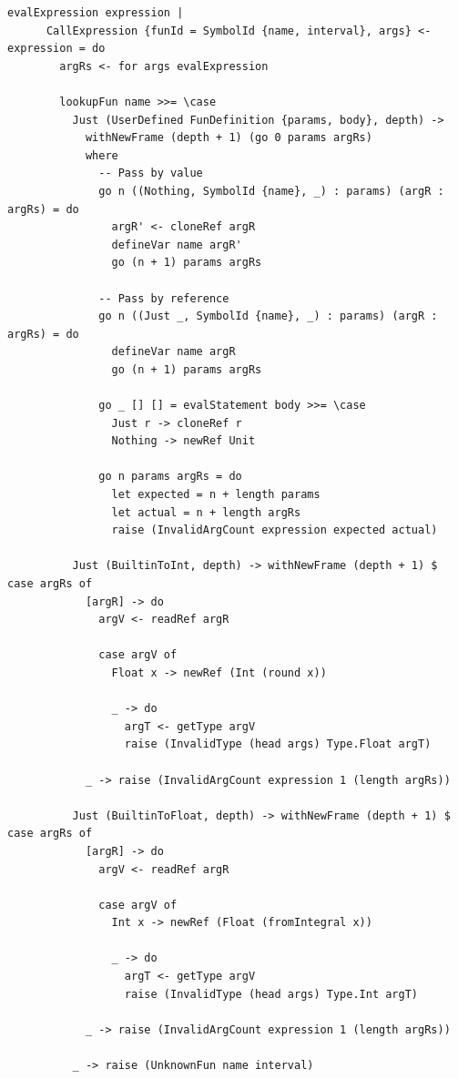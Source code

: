 \documentclass[UdineBachThesis,american,11pt]{PhdThesis}
\begin{document}
  \begin{lstlisting}[gobble=4,basicstyle=\ttfamily\small]
    evalExpression expression |
      CallExpression {funId = SymbolId {name, interval}, args} <- expression = do
        argRs <- for args evalExpression

        lookupFun name >>= \case
          Just (UserDefined FunDefinition {params, body}, depth) ->
            withNewFrame (depth + 1) (go 0 params argRs)
            where
              -- Pass by value
              go n ((Nothing, SymbolId {name}, _) : params) (argR : argRs) = do
                argR' <- cloneRef argR
                defineVar name argR'
                go (n + 1) params argRs

              -- Pass by reference
              go n ((Just _, SymbolId {name}, _) : params) (argR : argRs) = do
                defineVar name argR
                go (n + 1) params argRs

              go _ [] [] = evalStatement body >>= \case
                Just r -> cloneRef r
                Nothing -> newRef Unit

              go n params argRs = do
                let expected = n + length params
                let actual = n + length argRs
                raise (InvalidArgCount expression expected actual)

          Just (BuiltinToInt, depth) -> withNewFrame (depth + 1) $ case argRs of
            [argR] -> do
              argV <- readRef argR

              case argV of
                Float x -> newRef (Int (round x))

                _ -> do
                  argT <- getType argV
                  raise (InvalidType (head args) Type.Float argT)

            _ -> raise (InvalidArgCount expression 1 (length argRs))

          Just (BuiltinToFloat, depth) -> withNewFrame (depth + 1) $ case argRs of
            [argR] -> do
              argV <- readRef argR

              case argV of
                Int x -> newRef (Float (fromIntegral x))

                _ -> do
                  argT <- getType argV
                  raise (InvalidType (head args) Type.Int argT)

            _ -> raise (InvalidArgCount expression 1 (length argRs))

          _ -> raise (UnknownFun name interval)
  \end{lstlisting}
\end{document}
